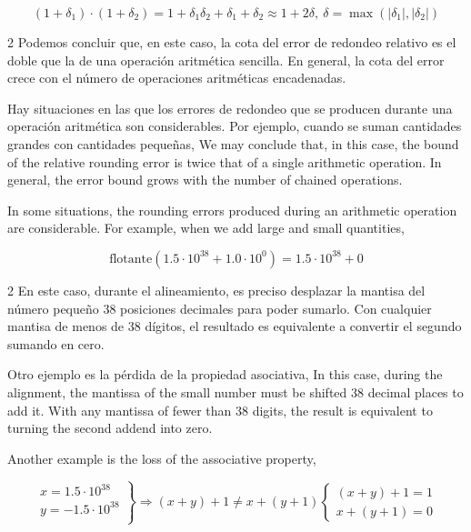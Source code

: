 \begin{equation*}
(1+\delta_1)\cdot(1+\delta_2)=1+\delta_1\delta_2+\delta_1+\delta_2\approx 1+2\delta,\ \delta=\max(\vert\delta_1\vert,\vert\delta_2\vert)
\end{equation*}

\begin{paracol}{2}
Podemos concluir que, en este caso, la cota del error de redondeo relativo es el doble que la de una operación aritmética sencilla. En general, la cota del error crece con el número de operaciones aritméticas encadenadas.

Hay situaciones en las que los errores de redondeo que se producen durante una operación aritmética son considerables. Por ejemplo, cuando se suman cantidades grandes con cantidades pequeñas,
\switchcolumn
We may conclude that, in this case, the bound of the relative rounding error is twice that of a single arithmetic operation. In general, the error bound grows with the number of chained operations.

In some situations, the rounding errors produced during an arithmetic operation are considerable. For example, when we add large and small quantities,
\end{paracol}
\begin{equation*}
\text{flotante}(1.5\cdot10^{38}+1.0\cdot10^0)=1.5\cdot10^{38} + 0
\end{equation*}
\begin{paracol}{2}
En este caso, durante el alineamiento, es preciso desplazar la mantisa del número pequeño 38 posiciones decimales para poder sumarlo. Con cualquier mantisa de menos de 38 dígitos, el resultado es equivalente a convertir el segundo sumando en cero.

Otro ejemplo es la pérdida de la propiedad asociativa,
\switchcolumn
In this case, during the alignment, the mantissa of the small number must be shifted 38 decimal places to add it. With any mantissa of fewer than 38 digits, the result is equivalent to turning the second addend into zero.

Another example is the loss of the associative property,
\end{paracol}
\begin{equation*}
\left. \begin{aligned}
x=1.5\cdot10^{38}\\
y=-1.5\cdot10^{38}\\
\end{aligned}
\right\}
\Rightarrow
(x+y)+1\neq x+(y+1)
\begin{cases}
(x+y)+1=1\\
x+(y+1)=0
\end{cases}
\end{equation*}
